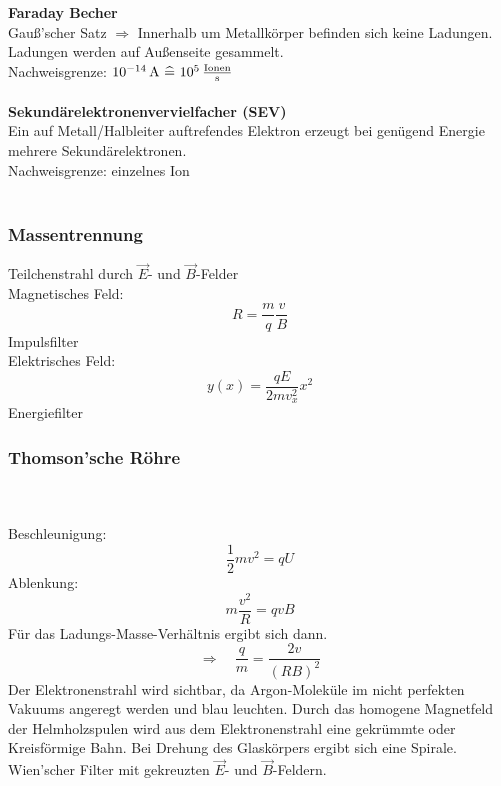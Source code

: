 \textbf{Faraday Becher}\\[5pt]
Gauß'scher Satz $ \Rightarrow $ Innerhalb um Metallkörper befinden sich keine Ladungen. Ladungen werden auf Außenseite gesammelt.\\[5pt]
Nachweisgrenze: $ 10^{-14} \, \tx{A} \ \widehat{=} \ 10^{5} \, \frac{\tx{Ionen}}{\tx{s}} $\\
\\[5pt]
\textbf{Sekundärelektronenvervielfacher (SEV)}\\[5pt]

Ein auf Metall/Halbleiter auftrefendes Elektron erzeugt bei genügend Energie mehrere Sekundärelektronen.\\[5pt]
Nachweisgrenze: einzelnes Ion\\
\\

\subsubsection{Massentrennung}

Teilchenstrahl durch $ \vec{E} $- und $ \vec{B} $-Felder\\
Magnetisches Feld:
\begin{equation*}
R = \frac{m}{q} \frac{v}{B}
\end{equation*}
Impulsfilter\\[5pt]
Elektrisches Feld:
\begin{equation*}
y(x) = \frac{q E}{2 m v_x^2} x^2
\end{equation*}
Energiefilter\\[5pt]

\subsubsection{Thomson'sche Röhre}

\\
\\
Beschleunigung:
\begin{equation*}
\frac{1}{2} m v^2 = q U
\end{equation*}
Ablenkung:
\begin{equation*}
m \frac{v^2}{R} = q v B
\end{equation*}
Für das Ladungs-Masse-Verhältnis ergibt sich dann.
\begin{equation*}
\Rightarrow \quad \frac{q}{m} = \frac{2 v}{(RB)^2}
\end{equation*}
Der Elektronenstrahl wird sichtbar, da Argon-Moleküle im nicht perfekten Vakuums angeregt werden und blau leuchten. Durch das homogene Magnetfeld der Helmholzspulen wird aus dem Elektronenstrahl eine gekrümmte oder Kreisförmige Bahn. Bei Drehung des Glaskörpers ergibt sich eine Spirale.\\[5pt]
Wien'scher Filter mit gekreuzten $ \vec{E} $- und $ \vec{B} $-Feldern.

